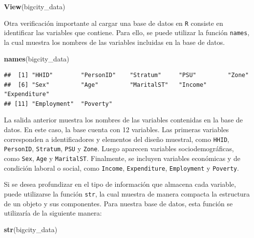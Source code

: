 \documentclass[
  spanish,
  12pt,
]{book}
\newenvironment{Shaded}{\begin{snugshade}}{\end{snugshade}}
\newcommand{\FunctionTok}[1]{\textcolor[rgb]{0.13,0.29,0.53}{\textbf{#1}}}
\newcommand{\NormalTok}[1]{#1}
\begin{document}
\begin{Shaded}
\begin{Highlighting}[]
\FunctionTok{View}\NormalTok{(bigcity\_data)}
\end{Highlighting}
\end{Shaded}

Otra verificación importante al cargar una base de datos en \texttt{R} consiste en identificar las variables que contiene. Para ello, se puede utilizar la función \texttt{names}, la cual muestra los nombres de las variables incluidas en la base de datos.

\begin{Shaded}
\begin{Highlighting}[]
\FunctionTok{names}\NormalTok{(bigcity\_data)}
\end{Highlighting}
\end{Shaded}

\begin{verbatim}
##  [1] "HHID"        "PersonID"    "Stratum"     "PSU"         "Zone"       
##  [6] "Sex"         "Age"         "MaritalST"   "Income"      "Expenditure"
## [11] "Employment"  "Poverty"
\end{verbatim}

La salida anterior muestra los nombres de las variables contenidas en la base de datos. En este caso, la base cuenta con 12 variables. Las primeras variables corresponden a identificadores y elementos del diseño muestral, como \texttt{HHID}, \texttt{PersonID}, \texttt{Stratum}, \texttt{PSU} y \texttt{Zone}. Luego aparecen variables sociodemográficas, como \texttt{Sex}, \texttt{Age} y \texttt{MaritalST}. Finalmente, se incluyen variables económicas y de condición laboral o social, como \texttt{Income}, \texttt{Expenditure}, \texttt{Employment} y \texttt{Poverty}.

Si se desea profundizar en el tipo de información que almacena cada variable, puede utilizarse la función \texttt{str}, la cual muestra de manera compacta la estructura de un objeto y sus componentes. Para nuestra base de datos, esta función se utilizaría de la siguiente manera:

\begin{Shaded}
\begin{Highlighting}[]
\FunctionTok{str}\NormalTok{(bigcity\_data)}
\end{Highlighting}
\end{Shaded}
\end{document}
